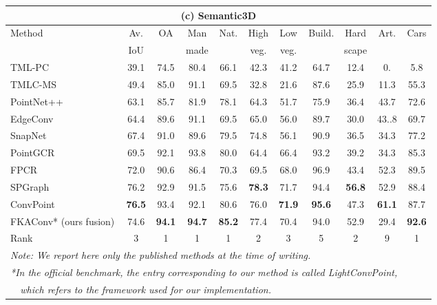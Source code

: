 \begin{table}[t!]
    \vspace{0.2cm}
    {
    \tiny
    \begin{tabular}{l|c@{~}c|c@{~}c@{~}c@{~}c@{~}c@{~}c@{~}c@{~}c}
        \multicolumn{11}{c}{\scriptsize (c) Semantic3D}\\ \hline
        Method          & Av. & OA  & Man   & Nat.   & High  & Low   & Build. & Hard  & Art. & Cars\\
                        & IoU &     & made  &           & veg.  & veg.  &           & scape & \\
        \hline
        TML-PC~\cite{montoya2014mind}	        & 39.1	& 74.5	& 80.4	& 66.1	& 42.3	& 41.2	& 64.7	& 12.4	& 0.	& 5.8 \\
        TMLC-MS~\cite{hackel2016fast}           & 49.4	& 85.0	& 91.1	& 69.5	& 32.8	& 21.6	& 87.6	& 25.9	& 11.3	& 55.3 \\
        PointNet++~\cite{qi2017pointnet++}      & 63.1	& 85.7	& 81.9	& 78.1	& 64.3	& 51.7	& 75.9	& 36.4	& 43.7	& 72.6 \\
        EdgeConv~\cite{contreras2019edge}       & 64.4	& 89.6	& 91.1	& 69.5	& 65.0	& 56.0	& 89.7	& 30.0	& 43..8	& 69.7 \\
        SnapNet~\cite{boulch2017snapnet}        & 67.4	& 91.0	& 89.6	& 79.5	& 74.8	& 56.1	& 90.9	& 36.5	& 34.3	& 77.2 \\
        PointGCR~\cite{ma2020global}                         & 69.5	& 92.1	& 93.8	& 80.0	& 64.4	& 66.4	& 93.2	& 39.2	& 34.3	& 85.3 \\
        FPCR~\cite{truong2019fast}	                            & 72.0	& 90.6  & 86.4	& 70.3	& 69.5  & 68.0	& 96.9	& 43.4	& 52.3	& 89.5 \\
        SPGraph~\cite{landrieu2018large}        & 76.2	& 92.9	& 91.5	& 75.6	& \textbf{78.3}	& 71.7	& 94.4	& \textbf{56.8}	& 52.9	& 88.4 \\
        ConvPoint~\cite{boulch2020convpoint} & \textbf{76.5}	& 93.4	& 92.1	& 80.6	& 76.0	& \textbf{71.9}	& \textbf{95.6}	& 47.3	& \textbf{61.1}	& 87.7 \\
        \hline
        FKAConv* (ours fusion)                   & 74.6	& \textbf{94.1}	& \textbf{94.7}	& \textbf{85.2}	& 77.4	& 70.4	& 94.0	& 52.9	& 29.4	& \textbf{92.6} \\
        Rank                                & 3	    & 1	    & 1	    & 1	    & 2	    & 3	    & 5	    & 2	    & 9	    & 1 \\
        \multicolumn{10}{l}{\textit{Note: We report here only the published methods at the time of writing.}}\\
        \multicolumn{10}{l}{\textit{*In the official benchmark, the entry corresponding to our method is called LightConvPoint,}}\\
        \multicolumn{10}{l}{\textit{~~which refers to the framework used for our implementation.}}
        
    \end{tabular}
    }
\end{table}

